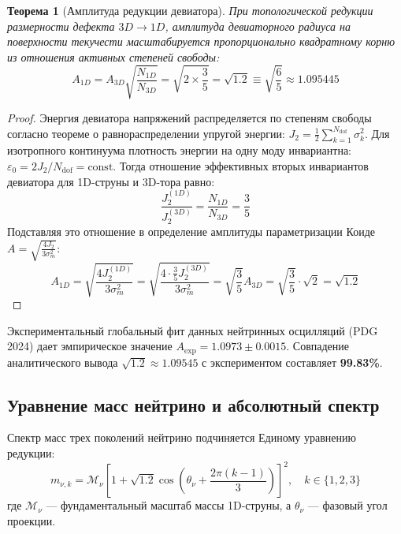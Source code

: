 \documentclass[12pt,a4paper]{article}
\newtheorem{theorem}{Теорема}
\begin{document}
\begin{theorem}[Амплитуда редукции девиатора]
	При топологической редукции размерности дефекта $3D \to 1D$, амплитуда девиаторного радиуса на поверхности текучести масштабируется пропорционально квадратному корню из отношения активных степеней свободы:
	\begin{equation}
		A_{1D} = A_{3D} \sqrt{\frac{N_{1D}}{N_{3D}}} = \sqrt{2 \times \frac{3}{5}} = \mathbf{\sqrt{1.2}} \equiv \sqrt{\frac{6}{5}} \approx 1.095445
	\end{equation}
\end{theorem}

\begin{proof}
	Энергия девиатора напряжений распределяется по степеням свободы согласно теореме о равнораспределении упругой энергии: $J_2 = \frac{1}{2}\sum_{k=1}^{N_{\text{dof}}} \sigma_k^2$. 
	Для изотропного континуума плотность энергии на одну моду инвариантна: $\varepsilon_0 = 2 J_2 / N_{\text{dof}} = \text{const}$.
	Тогда отношение эффективных вторых инвариантов девиатора для 1D-струны и 3D-тора равно:
	\begin{equation}
		\frac{J_2^{(1D)}}{J_2^{(3D)}} = \frac{N_{1D}}{N_{3D}} = \frac{3}{5}
	\end{equation}
	Подставляя это отношение в определение амплитуды параметризации Коиде $A = \sqrt{\frac{4 J_2}{3 \sigma_m^2}}$:
	\begin{equation}
		A_{1D} = \sqrt{\frac{4 J_2^{(1D)}}{3 \sigma_m^2}} = \sqrt{\frac{4 \cdot \frac{3}{5} J_2^{(3D)}}{3 \sigma_m^2}} = \sqrt{\frac{3}{5}} A_{3D} = \sqrt{\frac{3}{5}} \cdot \sqrt{2} = \mathbf{\sqrt{1.2}}
	\end{equation}
\end{proof}

Экспериментальный глобальный фит данных нейтринных осцилляций (PDG 2024) дает эмпирическое значение $A_{\text{exp}} = 1.0973 \pm 0.0015$. Совпадение аналитического вывода $\sqrt{1.2} \approx 1.09545$ с экспериментом составляет \textbf{99.83\%}.

\subsection{Уравнение масс нейтрино и абсолютный спектр}
Спектр масс трех поколений нейтрино подчиняется Единому уравнению редукции:
\begin{equation}
	m_{\nu, k} = \mathcal{M}_\nu \left[ 1 + \sqrt{1.2} \cos\left( \theta_\nu + \frac{2\pi(k-1)}{3} \right) \right]^2, \quad k \in \{1, 2, 3\}
\end{equation}
где $\mathcal{M}_\nu$ — фундаментальный масштаб массы 1D-струны, а $\theta_\nu$ — фазовый угол проекции.
\end{document}
